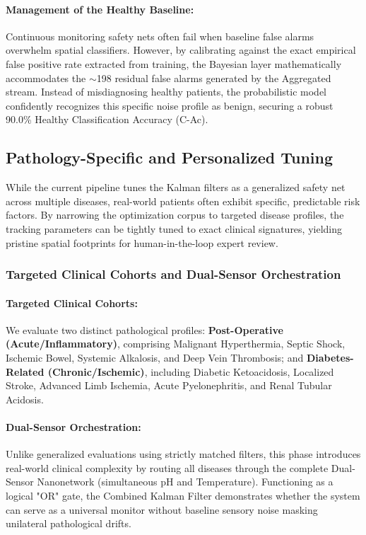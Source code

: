 \documentclass[sigconf]{acmart}
\begin{document}
\paragraph{Management of the Healthy Baseline:}
Continuous monitoring safety nets often fail when baseline false alarms overwhelm spatial classifiers. However, by calibrating against the exact empirical false positive rate extracted from training, the Bayesian layer mathematically accommodates the $\sim$198 residual false alarms generated by the Aggregated stream. Instead of misdiagnosing healthy patients, the probabilistic model confidently recognizes this specific noise profile as benign, securing a robust 90.0\% Healthy Classification Accuracy (C-Ac).

\subsection{Pathology-Specific and Personalized Tuning}
While the current pipeline tunes the Kalman filters as a generalized safety net across multiple diseases, real-world patients often exhibit specific, predictable risk factors. By narrowing the optimization corpus to targeted disease profiles, the tracking parameters can be tightly tuned to exact clinical signatures, yielding pristine spatial footprints for human-in-the-loop expert review.

\subsubsection{Targeted Clinical Cohorts and Dual-Sensor Orchestration}
\paragraph{Targeted Clinical Cohorts:} We evaluate two distinct pathological profiles: \textbf{Post-Operative (Acute/Inflammatory)}, comprising Malignant Hyperthermia, Septic Shock, Ischemic Bowel, Systemic Alkalosis, and Deep Vein Thrombosis; and \textbf{Diabetes-Related (Chronic/Ischemic)}, including Diabetic Ketoacidosis, Localized Stroke, Advanced Limb Ischemia, Acute Pyelonephritis, and Renal Tubular Acidosis.

\paragraph{Dual-Sensor Orchestration:} Unlike generalized evaluations using strictly matched filters, this phase introduces real-world clinical complexity by routing all diseases through the complete Dual-Sensor Nanonetwork (simultaneous pH and Temperature). Functioning as a logical "OR" gate, the Combined Kalman Filter demonstrates whether the system can serve as a universal monitor without baseline sensory noise masking unilateral pathological drifts.
\end{document}

